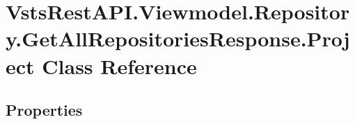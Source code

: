 \hypertarget{class_vsts_rest_a_p_i_1_1_viewmodel_1_1_repository_1_1_get_all_repositories_response_1_1_project}{}\section{Vsts\+Rest\+A\+P\+I.\+Viewmodel.\+Repository.\+Get\+All\+Repositories\+Response.\+Project Class Reference}
\label{class_vsts_rest_a_p_i_1_1_viewmodel_1_1_repository_1_1_get_all_repositories_response_1_1_project}
\subsection*{Properties}
